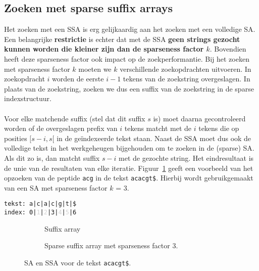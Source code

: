 \subsection{Zoeken met sparse suffix arrays}\label{subsec:zoeken-in-sparse-suffix-arrays}
Het zoeken met een SSA is erg gelijkaardig aan het zoeken met een volledige SA\@.
Een belangrijke \textbf{restrictie} is echter dat met de SSA \textbf{geen strings gezocht kunnen worden die kleiner zijn dan de sparseness factor $k$}.
Bovendien heeft deze sparseness factor ook impact op de zoekperformantie.
Bij het zoeken met sparseness factor $k$ moeten we $k$ verschillende zoekopdrachten uitvoeren.
In zoekopdracht $i$ worden de eerste $i - 1$ tekens van de zoekstring overgeslagen.
In plaats van de zoekstring, zoeken we dus een suffix van de zoekstring in de sparse indexstructuur.
\\ \\
Voor elke matchende suffix (stel dat dit suffix $s$ is) moet daarna gecontroleerd worden of de overgeslagen prefix van $i$ tekens matcht met de $i$ tekens die op posities $[s - i, s[$ in de geïndexeerde tekst staan.
Naast de SSA moet dus ook de volledige tekst in het werkgeheugen bijgehouden om te zoeken in de (sparse) SA\@.
Als dit zo is, dan matcht suffix $s - i$ met de gezochte string.
Het eindresultaat is de unie van de resultaten van elke iteratie.
Figuur~\ref{fig:sparse_sa} geeft een voorbeeld van het opzoeken van de peptide \texttt{acg} in de tekst \texttt{acacgt\$}.
Hierbij wordt gebruikgemaakt van een SA met sparseness factor $k$ = 3.

\begin{center}
    \texttt{tekst: a|c|a|c|g|t|\$\\index: 0|\textcolor{lightgrey}{1}|\textcolor{lightgrey}{2}|3|\textcolor{lightgrey}{4}|\textcolor{lightgrey}{5}|6}
\end{center}
\begin{figure}[H]
    \hfill
    \begin{subfigure}[t]{0.45\linewidth}
        \centering
        \caption{Suffix array}
    \end{subfigure}
    \hfill
    \begin{subfigure}[t]{0.45\linewidth}
        \centering
        \caption{Sparse suffix array met sparseness factor 3.}
    \end{subfigure}
    \hfill
    \caption{SA en SSA voor de tekst \texttt{acacgt\$}.}
    \label{fig:sparse_sa}
\end{figure}

